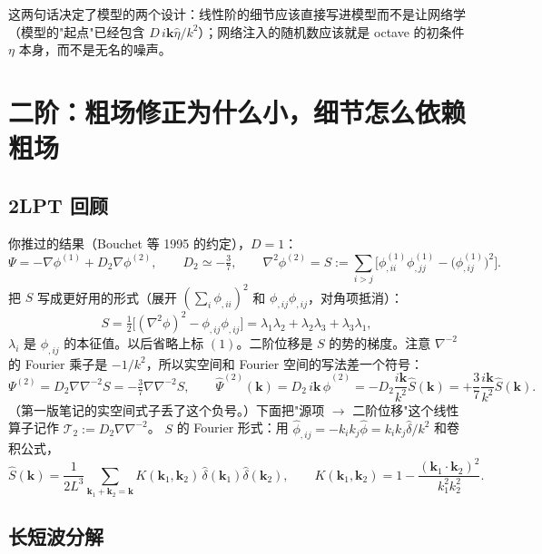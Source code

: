 \documentclass[11pt,UTF8,fontset=none]{ctexart}
\newcommand{\kk}{\mathbf{k}}
\begin{document}
这两句话决定了模型的两个设计：线性阶的细节应该直接写进模型而不是让网络学（模型的"起点"已经包含 $D\,i\kk\hat\eta/k^2$）；网络注入的随机数应该就是 octave 的初条件 $\eta$ 本身，而不是无名的噪声。

\section{二阶：粗场修正为什么小，细节怎么依赖粗场}

\subsection{2LPT 回顾}

你推过的结果（Bouchet 等 1995 的约定），$D=1$：
\begin{equation}
\Psi=-\nabla\phi^{(1)}+D_2\nabla\phi^{(2)},\qquad D_2\simeq-\tfrac37,\qquad
\nabla^2\phi^{(2)}=S:=\sum_{i>j}\Big[\phi^{(1)}_{,ii}\phi^{(1)}_{,jj}-\big(\phi^{(1)}_{,ij}\big)^2\Big].
\end{equation}
把 $S$ 写成更好用的形式（展开 $(\sum_i\phi_{,ii})^2$ 和 $\phi_{,ij}\phi_{,ij}$，对角项抵消）：
\begin{equation}
S=\tfrac12\Big[(\nabla^2\phi)^2-\phi_{,ij}\phi_{,ij}\Big]=\lambda_1\lambda_2+\lambda_2\lambda_3+\lambda_3\lambda_1,
\label{eq:S}
\end{equation}
$\lambda_i$ 是 $\phi_{,ij}$ 的本征值。以后省略上标 $(1)$。二阶位移是 $S$ 的势的梯度。注意 $\nabla^{-2}$ 的 Fourier 乘子是 $-1/k^2$，所以实空间和 Fourier 空间的写法差一个符号：
\begin{equation}
\Psi^{(2)}=D_2\nabla\nabla^{-2}S=-\tfrac37\nabla\nabla^{-2}S,\qquad
\hat\Psi^{(2)}(\kk)=D_2\,i\kk\,\hat\phi^{(2)}=-D_2\frac{i\kk}{k^2}\hat S(\kk)=+\frac37\frac{i\kk}{k^2}\hat S(\kk).
\label{eq:psi2}
\end{equation}
（第一版笔记的实空间式子丢了这个负号。）下面把"源项 $\to$ 二阶位移"这个线性算子记作 $\mathcal T_2:=D_2\nabla\nabla^{-2}$。
$S$ 的 Fourier 形式：用 $\hat\phi_{,ij}=-k_ik_j\hat\phi=k_ik_j\hat\delta/k^2$ 和卷积公式，
\begin{equation}
\hat S(\kk)=\frac{1}{2L^3}\sum_{\kk_1+\kk_2=\kk}K(\kk_1,\kk_2)\,\hat\delta(\kk_1)\hat\delta(\kk_2),\qquad
K(\kk_1,\kk_2)=1-\frac{(\kk_1\cdot\kk_2)^2}{k_1^2k_2^2}.
\label{eq:kernel}
\end{equation}

\subsection{长短波分解}
\end{document}
